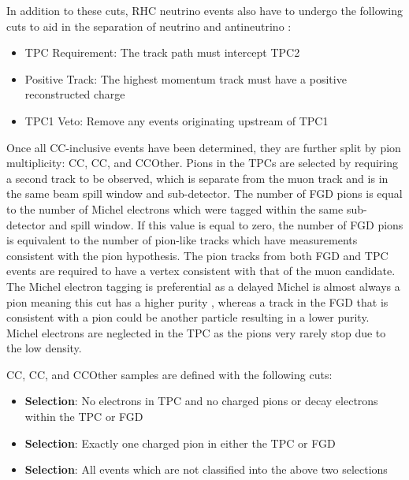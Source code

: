 In addition to these cuts, RHC neutrino events also have to undergo the following cuts to aid in the separation of neutrino and antineutrino \cite{t2k_tn_246}:

\begin{itemize}
\item TPC Requirement: The track path must intercept TPC2
\item Positive Track: The highest momentum track must have a positive reconstructed charge
\item TPC1 Veto: Remove any events originating upstream of TPC1
\end{itemize}

Once all CC-inclusive events have been determined, they are further split by pion multiplicity: CC\quickmath{0\pi}, CC\quickmath{1\pi}, and CCOther. Pions in the TPCs are selected by requiring a second track to be observed, which is separate from the muon track and is in the same beam spill window and sub-detector. The number of FGD pions is equal to the number of Michel electrons which were tagged within the same sub-detector and spill window. If this value is equal to zero, the number of FGD pions is equivalent to the number of pion-like tracks which have  measurements consistent with the pion hypothesis. The pion tracks from both FGD and TPC events are required to have a vertex consistent with that of the muon candidate. The Michel electron tagging is preferential as a delayed Michel is almost always a pion meaning this cut has a higher purity \cite{t2k_tn_104, t2k_tn_212}, whereas a track in the FGD that is consistent with a pion could be another particle resulting in a lower purity. Michel electrons are neglected in the TPC as the pions very rarely stop due to the low density.

CC\quickmath{0\pi}, CC\quickmath{1\pi}, and CCOther samples are defined with the following cuts:

\begin{itemize}
\item \textbf{ Selection}: No electrons in TPC and no charged pions or decay electrons within the TPC or FGD
\item \textbf{ Selection}: Exactly one charged pion in either the TPC or FGD
\item \textbf{ Selection}: All events which are not classified into the above two selections
\end{itemize}

